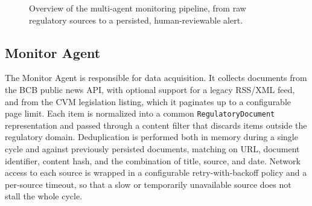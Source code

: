 \documentclass[conference]{IEEEtran}
\begin{document}
\begin{figure}[t]
\centering
{}
\caption{Overview of the multi-agent monitoring pipeline, from raw regulatory sources to a persisted, human-reviewable alert.}
\label{fig:architecture}
\end{figure}

\subsection{Monitor Agent}

The Monitor Agent is responsible for data acquisition. It collects documents from the BCB public news API, with optional support for a legacy RSS/XML feed, and from the CVM legislation listing, which it paginates up to a configurable page limit. Each item is normalized into a common \texttt{RegulatoryDocument} representation and passed through a content filter that discards items outside the regulatory domain. Deduplication is performed both in memory during a single cycle and against previously persisted documents, matching on URL, document identifier, content hash, and the combination of title, source, and date. Network access to each source is wrapped in a configurable retry-with-backoff policy and a per-source timeout, so that a slow or temporarily unavailable source does not stall the whole cycle.
\end{document}
